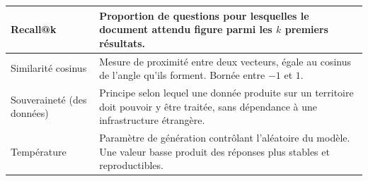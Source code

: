 \begin{longtable}[c]{| m{3.6cm} | m{11.4cm} |}
\hline
Recall@k & Proportion de questions pour lesquelles le document attendu figure parmi les $k$ premiers résultats. \\
\hline
Similarité cosinus & Mesure de proximité entre deux vecteurs, égale au cosinus de l'angle qu'ils forment. Bornée entre $-1$ et $1$. \\
\hline
Souveraineté (des données) & Principe selon lequel une donnée produite sur un territoire doit pouvoir y être traitée, sans dépendance à une infrastructure étrangère. \\
\hline
Température & Paramètre de génération contrôlant l'aléatoire du modèle. Une valeur basse produit des réponses plus stables et reproductibles. \\
\hline
\end{longtable}
